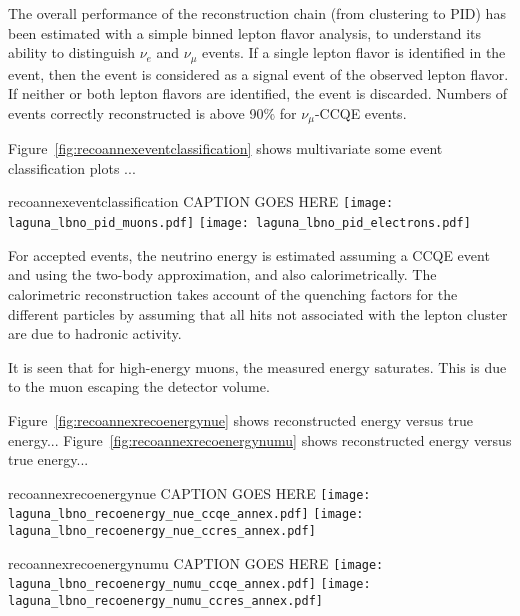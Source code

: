 The overall performance of the reconstruction chain (from clustering to PID) has been estimated with a simple binned lepton flavor analysis, 
to understand its ability to distinguish $\nu_{e}$ and $\nu_{\mu}$ events.
If a single lepton flavor is identified in the event, then the event is considered as a signal event of the observed lepton flavor. 
If neither or both lepton flavors are identified, the event is discarded.
Numbers of events correctly reconstructed is above 90$\%$ for $\nu_{\mu}$-CCQE events.


Figure~\ref{fig:recoannexeventclassification} shows multivariate some event classification plots ...

\begin{cdrfigure}{recoannexeventclassification}
{CAPTION GOES HERE}
\texttt{[image: laguna\_lbno\_pid\_muons.pdf]}
\texttt{[image: laguna\_lbno\_pid\_electrons.pdf]}
\end{cdrfigure}


For accepted events, the neutrino energy is estimated  assuming a CCQE event and using the two-body approximation, and also calorimetrically.
The calorimetric reconstruction takes account of the quenching factors for the different particles by 
assuming that all hits not associated with the lepton cluster are due to hadronic activity.

It is seen that for high-energy muons, the measured energy saturates. This is due to the muon escaping the detector volume. 



Figure~\ref{fig:recoannexrecoenergynue} shows reconstructed energy versus true energy...
Figure~\ref{fig:recoannexrecoenergynumu} shows reconstructed energy versus true energy...

\begin{cdrfigure}{recoannexrecoenergynue}
{CAPTION GOES HERE}
\texttt{[image: laguna\_lbno\_recoenergy\_nue\_ccqe\_annex.pdf]}
\texttt{[image: laguna\_lbno\_recoenergy\_nue\_ccres\_annex.pdf]}
\end{cdrfigure}

\begin{cdrfigure}{recoannexrecoenergynumu}
{CAPTION GOES HERE}
\texttt{[image: laguna\_lbno\_recoenergy\_numu\_ccqe\_annex.pdf]}
\texttt{[image: laguna\_lbno\_recoenergy\_numu\_ccres\_annex.pdf]}
\end{cdrfigure}

